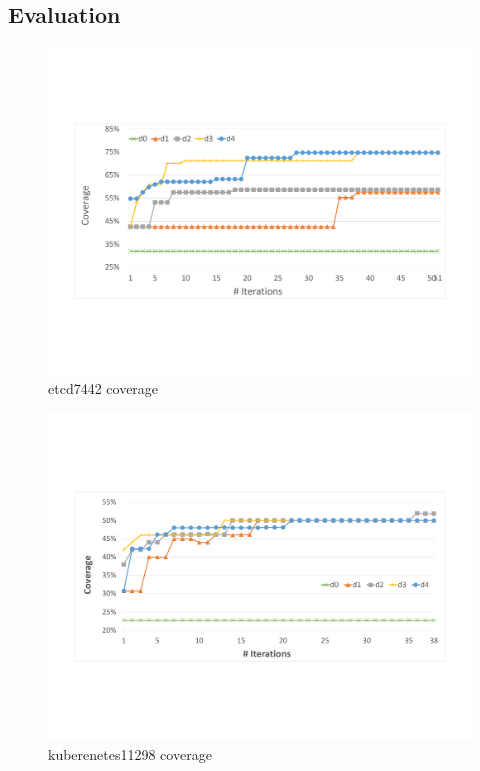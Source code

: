 \subsection{Evaluation}

\begin{figure}
\centering
  \includegraphics[width=.95\linewidth]{figs/coverage_etcd7443.pdf}
  \caption{etcd7442 coverage}
  \label{fig:etcd_coverage}
\end{figure}


\begin{figure}
\centering
  \includegraphics[width=.95\linewidth]{figs/coverage_kubernetes11298.pdf}
  \caption{kuberenetes11298 coverage}
  \label{fig:kubernetes_coverage}
\end{figure}
